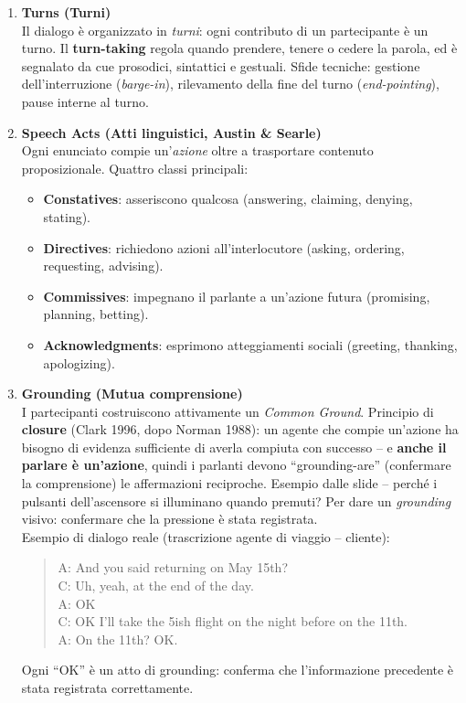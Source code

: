 \documentclass[12pt,a4paper]{article}
\begin{document}
\begin{enumerate}[leftmargin=1.5em, label=\textbf{\arabic*.}]

  \item \textbf{Turns (Turni)}\\
    Il dialogo è organizzato in \emph{turni}: ogni contributo di un partecipante è un turno. Il \textbf{turn-taking} regola quando prendere, tenere o cedere la parola, ed è segnalato da cue prosodici, sintattici e gestuali. Sfide tecniche: gestione dell'interruzione (\emph{barge-in}), rilevamento della fine del turno (\emph{end-pointing}), pause interne al turno.

  \item \textbf{Speech Acts (Atti linguistici, Austin \& Searle)}\\
    Ogni enunciato compie un'\emph{azione} oltre a trasportare contenuto proposizionale. Quattro classi principali:
    \begin{itemize}[leftmargin=1.5em, nosep]
      \item \textbf{Constatives}: asseriscono qualcosa (answering, claiming, denying, stating).
      \item \textbf{Directives}: richiedono azioni all'interlocutore (asking, ordering, requesting, advising).
      \item \textbf{Commissives}: impegnano il parlante a un'azione futura (promising, planning, betting).
      \item \textbf{Acknowledgments}: esprimono atteggiamenti sociali (greeting, thanking, apologizing).
    \end{itemize}

  \item \textbf{Grounding (Mutua comprensione)}\\
    I partecipanti costruiscono attivamente un \emph{Common Ground}. Principio di \textbf{closure} (Clark 1996, dopo Norman 1988): un agente che compie un'azione ha bisogno di evidenza sufficiente di averla compiuta con successo -- e \textbf{anche il parlare è un'azione}, quindi i parlanti devono ``grounding-are'' (confermare la comprensione) le affermazioni reciproche. Esempio dalle slide -- perché i pulsanti dell'ascensore si illuminano quando premuti? Per dare un \emph{grounding} visivo: confermare che la pressione è stata registrata. \\
    Esempio di dialogo reale (trascrizione agente di viaggio -- cliente):
    \begin{quote}\footnotesize
    A: And you said returning on May 15th?\\
    C: Uh, yeah, at the end of the day.\\
    A: OK\\
    C: OK I'll take the 5ish flight on the night before on the 11th.\\
    A: On the 11th? OK.
    \end{quote}
    Ogni ``OK'' è un atto di grounding: conferma che l'informazione precedente è stata registrata correttamente.


\end{enumerate}
\end{document}

